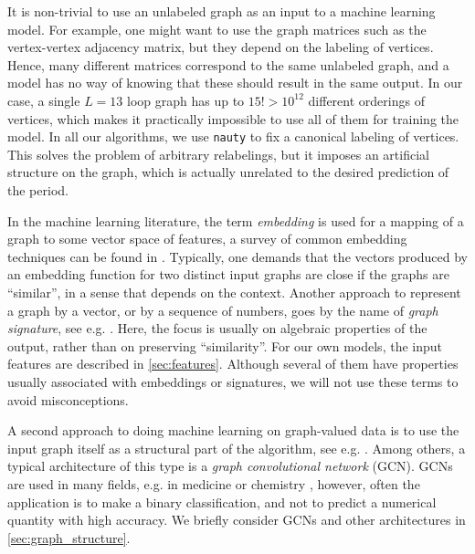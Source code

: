 \documentclass[11pt]{scrartcl}
\numberwithin{equation}{section}
\begin{document}
It is non-trivial to use an unlabeled graph as an input to a machine learning model. For example, one might want to use the graph matrices such as the vertex-vertex adjacency matrix, but they depend on the labeling of vertices. Hence, many different matrices correspond to the same unlabeled graph, and a model has no way of knowing that these should result in the same output. In our case,  a single $L=13$ loop graph has up to $15!>10^{12}$ different orderings of vertices, which makes it practically impossible to use all of them for training the model. In all our algorithms, we use  \texttt{nauty} \cite{mckay_practical_2014} to fix a canonical labeling of vertices. This solves the problem of arbitrary relabelings, but it imposes an artificial structure on the graph, which is actually unrelated to the desired prediction of the period. 

In the machine learning literature, the term \emph{embedding} is used for a mapping of a graph to some vector space of features, a survey of common embedding techniques can be found in \cite{yan_graph_2007,goyal_graph_2018,khosla_comparative_2020,cai_comprehensive_2018}. Typically, one demands that the vectors produced by an embedding function for two distinct input graphs are close if the graphs are \enquote{similar}, in a sense that depends on the context. 
Another approach to represent a graph by a vector, or by a sequence of numbers, goes by the name of \emph{graph signature}, see e.g. \cite{toth_capturing_2022,caudillo_signatures_2023}. Here, the focus is usually on algebraic properties of the output, rather than on preserving \enquote{similarity}. For our own models, the input features are described in  \cref{sec:features}.  Although several of them have properties usually associated with embeddings or signatures, we will not use these terms to avoid misconceptions.



A second approach to doing machine learning on graph-valued data is to use the input graph itself as a structural part of the algorithm, see e.g.  \cite{wu_comprehensive_2021,ying_gnnexplainer_2019,bevilacqua_equivariant_2022}. Among others, a typical architecture of this type is a  \emph{graph convolutional network} (GCN). 
GCNs are used in many fields, e.g.  in medicine \cite{ahmedt-aristizabal_survey_2022} or chemistry \cite{kroll_general_2023}, however, often the application is to make a binary classification, and not to predict a numerical quantity with high accuracy. We briefly consider GCNs and other architectures in \cref{sec:graph_structure}.
\end{document}

